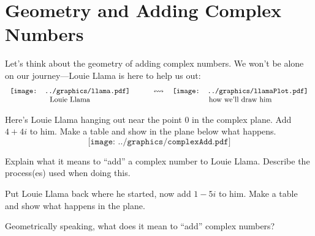 \newpage
\section{Geometry and Adding Complex Numbers}\label{A:complexAddition}


Let's think about the geometry of adding complex numbers. We won't be
alone on our journey---Louie Llama is here to help
us out:
\[
\begin{tabular}{ccc}
\texttt{[image: ../graphics/llama.pdf]} & \qquad $\leftrightsquigarrow$\qquad& \texttt{[image: ../graphics/llamaPlot.pdf]}\\
Louie Llama & & how we'll draw him
\end{tabular}
\]

\begin{prob} 
Here's Louie Llama hanging out near the point $0$ in the complex
plane. Add $4+4i$ to him. Make a table and show in the plane below what happens.
\[
\texttt{[image: ../graphics/complexAdd.pdf]}
\]
\end{prob}

\begin{prob}
Explain what it means to ``add'' a complex number to Louie
Llama. Describe the process(es) used when doing this.
\end{prob}


\begin{prob} 
Put Louie Llama back where he started, now add $1-5i$ to him.  Make a
table and show what happens in the plane.
\end{prob}


\begin{prob} 
Geometrically speaking, what does it mean to ``add'' complex numbers?
\end{prob}
